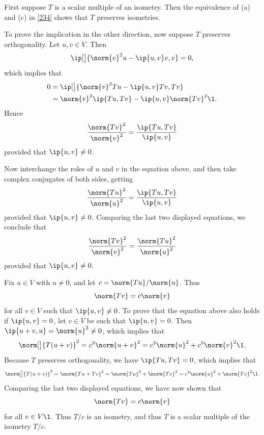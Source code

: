 \begin{Solution}
First suppose $T$ is a scalar multiple of an isometry. Then the equivalence of (a) and (c) in \ref{234} shows that $T$ preserves isometries.

To prove the implication in the other direction, now suppose $T$ preserves orthogonality. Let $u, v \in V$. Then
\[
\ip[\big]{ \norm{v}^2 u - \ip{u, v} v, v} = 0,
\]
which implies that
\begin{align*}
0 &= \ip[\big]{ \norm{v}^2 Tu - \ip{u, v} Tv, Tv} \\
&= \norm{v}^2 \ip{Tu, Tv} - \ip{u, v} \norm{Tv}^2\1.
\end{align*}
Hence
\[
\frac{ \norm{Tv}^2 }{\norm{v}^2 } = \frac{ \ip{Tu, Tv} }{\ip{u,v}}
\]
provided that $\ip{u, v} \ne 0$.

Now interchange the roles of $u$ and $v$ in the equation above, and then take complex conjugates of both sides, getting
\[
\frac{ \norm{Tu}^2 }{\norm{u}^2 } = \frac{ \ip{Tu, Tv} }{\ip{u,v}}
\]
provided that $\ip{u, v} \ne 0$. Comparing the last two displayed equations, we conclude that
\[
\frac{ \norm{Tv}^2 }{\norm{v}^2 } = \frac{ \norm{Tu}^2 }{\norm{u}^2 }
\]
provided that $\ip{u, v} \ne 0$.

Fix $u \in V$ with $u \ne 0$, and let $c = \norm{Tu}/\norm{u}$. Thus
\[
\norm{Tv} = c \norm{v}
\]
for all $v \in V$ such that $\ip{u,v} \ne 0$. To prove that the equation above also holds if $\ip{u, v} = 0$, let $v\in V$ be such that $\ip{u,v} = 0$. Then $\ip{u+v, u} = \norm{u}^2 \ne 0$, which implies that
\[
\norm[\big]{T(u+v)}^2 = c^2 \norm{u+v}^2 = c^2 \norm{u}^2 + c^2 \norm{v}^2\1.
\]
Because $T$ preserves orthogonality, we have $\ip{Tu, Tv} = 0$, which implies that
\[
\norm[\big]{T(u + v)}^2 = \norm{Tu + Tv}^2 = \norm{Tu}^2 + \norm{Tv}^2 = c^2 \norm{u}^2 + \norm{Tv}^2\1.
\]
Comparing the last two displayed equations, we have now shown that
\[
\norm{Tv} = c \norm{v}
\]
for all $v \in V\1$. Thus $T/c$ is an isometry, and thus $T$ is a scalar multiple of the isometry $T/c$.
\end{Solution}

